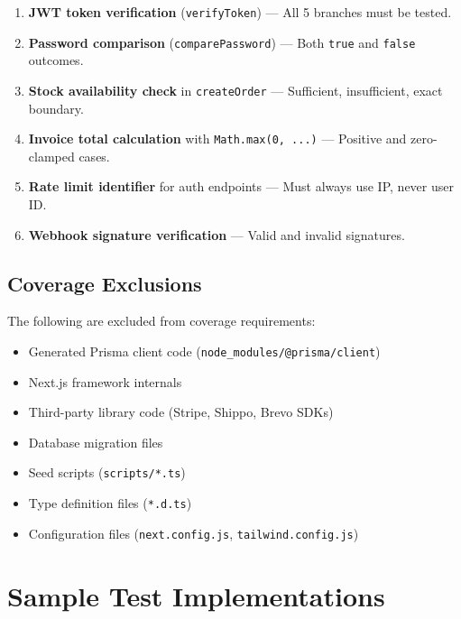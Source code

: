 \documentclass[12pt,a4paper]{report}
\begin{document}
\begin{tcolorbox}[criticalbox, title={Must-Have 100\% Branch Coverage}]
\begin{enumerate}
  \item \textbf{JWT token verification} (\texttt{verifyToken}) --- All 5 branches must be tested.
  \item \textbf{Password comparison} (\texttt{comparePassword}) --- Both \texttt{true} and \texttt{false} outcomes.
  \item \textbf{Stock availability check} in \texttt{createOrder} --- Sufficient, insufficient, exact boundary.
  \item \textbf{Invoice total calculation} with \texttt{Math.max(0, ...)} --- Positive and zero-clamped cases.
  \item \textbf{Rate limit identifier} for auth endpoints --- Must always use IP, never user ID.
  \item \textbf{Webhook signature verification} --- Valid and invalid signatures.
\end{enumerate}
\end{tcolorbox}

\section{Coverage Exclusions}

The following are excluded from coverage requirements:
\begin{itemize}
  \item Generated Prisma client code (\texttt{node\_modules/@prisma/client})
  \item Next.js framework internals
  \item Third-party library code (Stripe, Shippo, Brevo SDKs)
  \item Database migration files
  \item Seed scripts (\texttt{scripts/*.ts})
  \item Type definition files (\texttt{*.d.ts})
  \item Configuration files (\texttt{next.config.js}, \texttt{tailwind.config.js})
\end{itemize}


\chapter{Sample Test Implementations}
\end{document}
